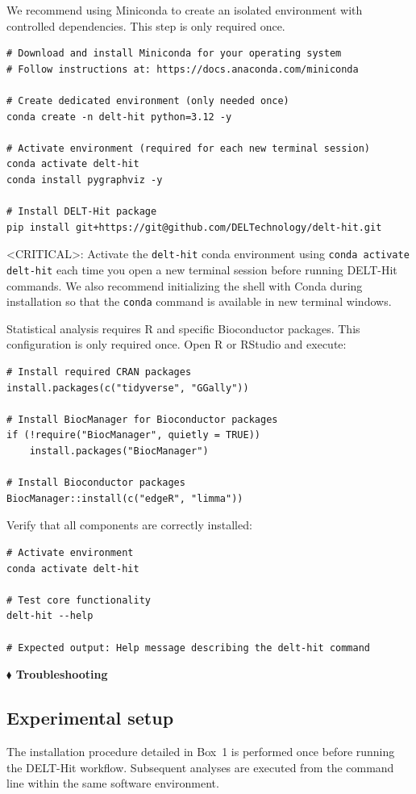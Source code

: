 \begin{tcolorbox}[
  colback=gray!10,
  colframe=gray!50,
  title=Box 1 | Installing DELT-Hit,
  fonttitle=\bfseries
]


We recommend using Miniconda to create an isolated environment with controlled dependencies. This step is only required once.


\begin{lstlisting}
# Download and install Miniconda for your operating system
# Follow instructions at: https://docs.anaconda.com/miniconda

# Create dedicated environment (only needed once)
conda create -n delt-hit python=3.12 -y

# Activate environment (required for each new terminal session)
conda activate delt-hit
conda install pygraphviz -y

# Install DELT-Hit package
pip install git+https://git@github.com/DELTechnology/delt-hit.git
\end{lstlisting}
<CRITICAL>: Activate the \texttt{delt-hit} conda environment using \texttt{conda activate delt-hit} each time you open a new terminal session before running DELT-Hit commands. We also recommend initializing the shell with Conda during installation so that the \texttt{conda} command is available in new terminal windows. 



Statistical analysis requires R and specific Bioconductor packages. This configuration is only required once. Open R or RStudio and execute:


\begin{lstlisting}
# Install required CRAN packages
install.packages(c("tidyverse", "GGally"))

# Install BiocManager for Bioconductor packages
if (!require("BiocManager", quietly = TRUE))
    install.packages("BiocManager")

# Install Bioconductor packages
BiocManager::install(c("edgeR", "limma"))
\end{lstlisting}


Verify that all components are correctly installed:


\begin{lstlisting}
# Activate environment
conda activate delt-hit

# Test core functionality
delt-hit --help

# Expected output: Help message describing the delt-hit command
\end{lstlisting}

\textbf{$\blacklozenge$ Troubleshooting}

\end{tcolorbox}
\clearpage

\subsection{Experimental setup}
The installation procedure detailed in Box~1 is performed once before running the DELT-Hit workflow. Subsequent analyses are executed from the command line within the same software environment.

